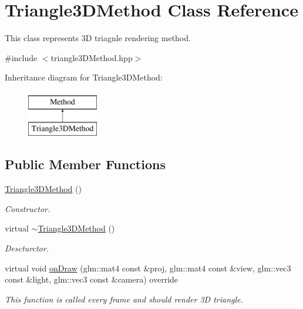 \hypertarget{classTriangle3DMethod}{}\section{Triangle3\+D\+Method Class Reference}
\label{classTriangle3DMethod}


This class represents 3D triagnle rendering method.  




{\ttfamily \#include $<$triangle3\+D\+Method.\+hpp$>$}

Inheritance diagram for Triangle3\+D\+Method\+:\begin{figure}[H]
\begin{center}
\leavevmode
\includegraphics[height=2.000000cm]{classTriangle3DMethod}
\end{center}
\end{figure}
\subsection*{Public Member Functions}
\begin{DoxyCompactItemize}
\item 
\mbox{\label{classTriangle3DMethod_aaea704a2e406e58a7cf0e23c95462cc1}} 
\hyperlink{classTriangle3DMethod_aaea704a2e406e58a7cf0e23c95462cc1}{Triangle3\+D\+Method} ()
\begin{DoxyCompactList}\small\item\em Constructor. \end{DoxyCompactList}\item 
\mbox{\label{classTriangle3DMethod_ae024198c8eb3c4ebb984e191acdf5d83}} 
virtual \hyperlink{classTriangle3DMethod_ae024198c8eb3c4ebb984e191acdf5d83}{$\sim$\+Triangle3\+D\+Method} ()
\begin{DoxyCompactList}\small\item\em Descturctor. \end{DoxyCompactList}\item 
virtual void \hyperlink{classTriangle3DMethod_a8e006abc4a38f47bfda0263acfbb7585}{on\+Draw} (glm\+::mat4 const \&proj, glm\+::mat4 const \&view, glm\+::vec3 const \&light, glm\+::vec3 const \&camera) override
\begin{DoxyCompactList}\small\item\em This function is called every frame and should render 3D triangle. \end{DoxyCompactList}\end{DoxyCompactItemize}

